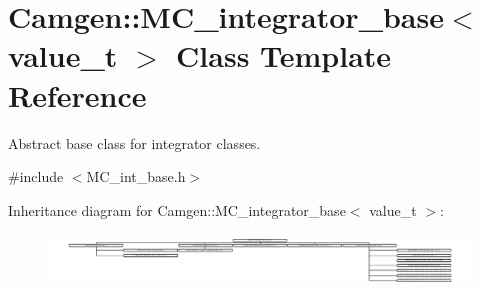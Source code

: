 \hypertarget{a00370}{}\section{Camgen\+:\+:M\+C\+\_\+integrator\+\_\+base$<$ value\+\_\+t $>$ Class Template Reference}
\label{a00370}


Abstract base class for integrator classes.  




{\ttfamily \#include $<$M\+C\+\_\+int\+\_\+base.\+h$>$}

Inheritance diagram for Camgen\+:\+:M\+C\+\_\+integrator\+\_\+base$<$ value\+\_\+t $>$\+:\begin{figure}[H]
\begin{center}
\leavevmode
\includegraphics[height=1.398058cm]{a00370}
\end{center}
\end{figure}
